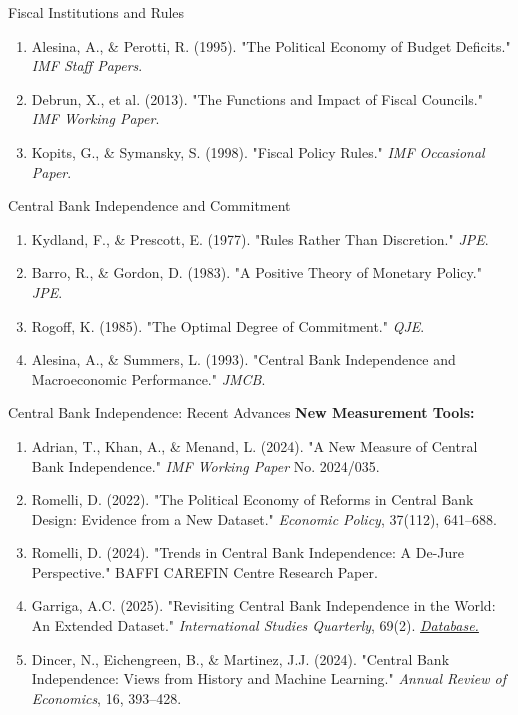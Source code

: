 \documentclass[10pt]{beamer}
\begin{document}
\begin{frame}{Fiscal Institutions and Rules}
\footnotesize
\begin{enumerate}
\item Alesina, A., \& Perotti, R. (1995). "The Political Economy of Budget Deficits." \emph{IMF Staff Papers}.
\item Debrun, X., et al. (2013). "The Functions and Impact of Fiscal Councils." \emph{IMF Working Paper}.
\item Kopits, G., \& Symansky, S. (1998). "Fiscal Policy Rules." \emph{IMF Occasional Paper}.
\end{enumerate}
\end{frame}


\begin{frame}{Central Bank Independence and Commitment}
\footnotesize
\begin{enumerate}
\item Kydland, F., \& Prescott, E. (1977). "Rules Rather Than Discretion." \emph{JPE}.
\item Barro, R., \& Gordon, D. (1983). "A Positive Theory of Monetary Policy." \emph{JPE}.
\item Rogoff, K. (1985). "The Optimal Degree of Commitment." \emph{QJE}.
\item Alesina, A., \& Summers, L. (1993). "Central Bank Independence and Macroeconomic Performance." \emph{JMCB}.
\end{enumerate}
\end{frame}

\begin{frame}{Central Bank Independence: Recent Advances}
\footnotesize
\textbf{New Measurement Tools:}
\begin{enumerate}
\item Adrian, T., Khan, A., \& Menand, L. (2024). "A New Measure of Central Bank Independence." \emph{IMF Working Paper} No. 2024/035.
\item Romelli, D. (2022). "The Political Economy of Reforms in Central Bank Design: Evidence from a New Dataset." \emph{Economic Policy}, 37(112), 641–688.
\item Romelli, D. (2024). "Trends in Central Bank Independence: A De-Jure Perspective." BAFFI CAREFIN Centre Research Paper.
\item Garriga, A.C. (2025). "Revisiting Central Bank Independence in the World: An Extended Dataset." \emph{International Studies Quarterly}, 69(2). \href{https://sites.google.com/site/carogarriga/cbi-data-1}{\emph{Database.}}
\item Dincer, N., Eichengreen, B., \& Martinez, J.J. (2024). "Central Bank Independence: Views from History and Machine Learning." \emph{Annual Review of Economics}, 16, 393–428. 
\end{enumerate}
\end{frame}
\end{document}

